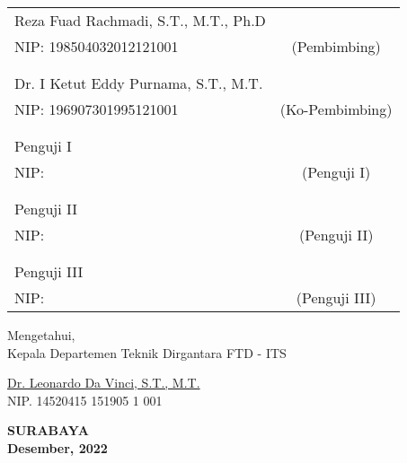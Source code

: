 \noindent
\begin{tabularx}{\textwidth}{X c}
  Reza Fuad Rachmadi, S.T., M.T., Ph.D &                 \\
  NIP: 198504032012121001              & (Pembimbing)    \\
                                       &                 \\
                                       &                 \\
  Dr. I Ketut Eddy Purnama, S.T., M.T. &                 \\
  NIP: 196907301995121001              & (Ko-Pembimbing) \\
                                       &                 \\
                                       &                 \\
  Penguji I                            &                 \\
  NIP:                                 & (Penguji I)     \\
                                       &                 \\
                                       &                 \\
  Penguji II                           &                 \\
  NIP:                                 & (Penguji II)    \\
                                       &                 \\
                                       &                 \\
  Penguji III                          &                 \\
  NIP:                                 & (Penguji III)   \\
\end{tabularx}
\endgroup

\vspace{2ex}

\begin{center}
  Mengetahui, \\
  Kepala Departemen Teknik Dirgantara FTD - ITS \\

  \vspace{10ex}

  \underline{Dr. Leonardo Da Vinci, S.T., M.T.} \\
  NIP. 14520415 151905 1 001
\end{center}

\vfill

\begin{center}
  \textbf{SURABAYA} \\
  \textbf{Desember, 2022}
\end{center}
\endgroup
